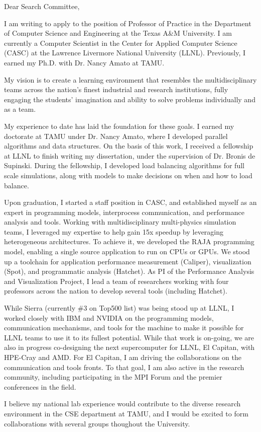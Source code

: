 \documentclass[10pt,letterpaper]{moderncv/moderncv}
\begin{document}
Dear Search Committee,

I am writing to apply to the position of Professor of Practice in the Department of Computer Science and Engineering at the Texas A\&M University.  I am currently a Computer Scientist in the Center for Applied Computer Science (CASC) at the Lawrence Livermore National University (LLNL).  Previously, I earned my Ph.D. with Dr. Nancy Amato at TAMU.

My vision is to create a learning environment that resembles the multidisciplinary teams across the nation's finest industrial and research institutions,
fully engaging the students' imagination and ability to solve problems individually and as a team.

My experience to date has laid the foundation for these goals.  I earned my doctorate at TAMU under Dr. Nancy Amato, where I developed parallel algorithms and data structures.
On the basis of this work, I received a fellowship at LLNL to finish writing my dissertation, under the supervision of Dr. Bronis de Supinski.
During the fellowship, I developed load balancing algorithms for full scale simulations, along with models to make decisions on when and how to load balance.

Upon graduation, I started a staff position in CASC, and established myself as an expert in programming models, interprocess communication, and performance analysis and tools.
Working with multidisciplinary multi-physics simulation teams, I leveraged my expertise to help gain 15x speedup by leveraging heterogeneous architectures.
To achieve it, we developed the RAJA programming model, enabling a single source application to run on CPUs or GPUs.
We stood up a toolchain for application performance measurement (Caliper), visualization (Spot), and programmatic analysis (Hatchet).
As PI of the Performance Analysis and Visualization Project, I lead a team of researchers working with four professors across the nation
to develop several tools (including Hatchet).

While Sierra (currently \#3 on Top500 list) was being stood up at LLNL, I worked closely with IBM and NVIDIA on the programming models,
communication mechanisms, and tools for the machine to make it possible for LLNL teams to use it to its fullest potential.
While that work is on-going, we are also in progress co-designing the next supercomputer for LLNL, El Capitan, with HPE-Cray and AMD.
For El Capitan, I am driving the collaborations on the communication and tools fronts.  To that goal,
I am also active in the research community, including participating in the MPI Forum and the premier conferences in the field.

I believe my national lab experience would contribute to the diverse research environment in the CSE department at TAMU, and I would be excited to form collaborations with several groups thoughout the University.



\end{document}
